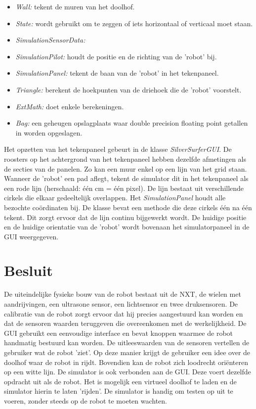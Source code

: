 \documentclass[tt3]{penoverslag}
\begin{document}
\begin{itemize}
\item \textit{Wall:} tekent de muren van het doolhof.
\item \textit{State:} wordt gebruikt om te zeggen of iets horizontaal of verticaal moet staan.
\item \textit{SimulationSensorData: }
\item \textit{SimulationPilot:} houdt de positie en de richting van de 'robot' bij.
\item \textit{SimulationPanel:} tekent de baan van de 'robot' in het tekenpaneel.
\item \textit{Triangle:} berekent de hoekpunten van de driehoek die de 'robot' voorstelt.
\item \textit{ExtMath:} doet enkele berekeningen.
\item \textit{Bag:\cite{Bag.java} } een geheugen opslagplaats waar double precision floating point getallen in worden opgeslagen.
\end{itemize}

Het opzetten van het tekenpaneel gebeurt in de klasse \textit{SilverSurferGUI}. De roosters op het achtergrond van het tekenpaneel hebben dezelfde afmetingen als de secties van de panelen. Zo kan een muur enkel op een lijn van het grid staan.
Wanneer de 'robot' een pad aflegt, tekent de simulator dit in het tekenpaneel als een rode lijn (herschaald: \'e\'en cm = \'e\'en pixel). De lijn  bestaat uit verschillende cirkels die elkaar gedeeltelijk overlappen. Het \textit{SimulationPanel} houdt alle bezochte co\"ordinaten bij. De klasse bevat een methode die deze cirkels \'e\'en na \'e\'en tekent. Dit zorgt ervoor dat de lijn continu bijgewerkt wordt. De huidige positie en de huidige orientatie van de 'robot' wordt bovenaan het simulatorpaneel in de GUI weergegeven.

\section{Besluit} %
\label{sec:besl}
De uiteindelijke fysieke bouw van de robot bestaat uit de NXT, de wielen met aandrijvingen, een ultrasone sensor, een lichtsensor en twee druksensoren.
De calibratie van de robot zorgt ervoor dat hij precies aangestuurd kan worden en dat de sensoren waarden teruggeven die overeenkomen met de werkelijkheid.
De GUI gebruikt een eenvoudige interface en bevat knoppen waarmee de robot handmatig bestuurd kan worden. De uitleeswaarden van de sensoren vertellen de gebruiker wat de robot 'ziet'. Op deze manier krijgt de gebruiker een idee over de doolhof waar de robot in rijdt. Bovendien kan de robot zich loodrecht ori\"enteren op een witte lijn. De simulator is ook verbonden aan de GUI. Deze voert dezelfde opdracht uit als de robot. Het is mogelijk een virtueel doolhof te laden en de simulator hierin te laten 'rijden'. De simulator is handig om testen op uit te voeren, zonder steeds op de robot te moeten wachten.
\end{document}
